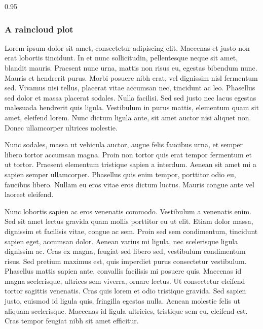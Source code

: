 \documentclass[]{elsarticle} %
\begin{document}
\begin{table}[h]
\begin{centerbox}
\begin{threeparttable}
\begin{tabularx}{0.95\textwidth}
\end{tabularx}
\end{threeparttable}\par\end{centerbox}

\end{table}
 

\newpage

\hypertarget{a-raincloud-plot}{%
\subsubsection{A raincloud plot}\label{a-raincloud-plot}}

Lorem ipsum dolor sit amet, consectetur adipiscing elit. Maecenas et
justo non erat lobortis tincidunt. In et nunc sollicitudin, pellentesque
neque sit amet, blandit mauris. Praesent nunc urna, mattis non risus eu,
egestas bibendum nunc. Mauris et hendrerit purus. Morbi posuere nibh
erat, vel dignissim nisl fermentum sed. Vivamus nisi tellus, placerat
vitae accumsan nec, tincidunt ac leo. Phasellus sed dolor et massa
placerat sodales. Nulla facilisi. Sed sed justo nec lacus egestas
malesuada hendrerit quis ligula. Vestibulum in purus mattis, elementum
quam sit amet, eleifend lorem. Nunc dictum ligula ante, sit amet auctor
nisi aliquet non. Donec ullamcorper ultrices molestie.

Nunc sodales, massa ut vehicula auctor, augue felis faucibus urna, et
semper libero tortor accumsan magna. Proin non tortor quis erat tempor
fermentum et ut tortor. Praesent elementum tristique sapien a interdum.
Aenean sit amet mi a sapien semper ullamcorper. Phasellus quis enim
tempor, porttitor odio eu, faucibus libero. Nullam eu eros vitae eros
dictum luctus. Mauris congue ante vel laoreet eleifend.

Nunc lobortis sapien ac eros venenatis commodo. Vestibulum a venenatis
enim. Sed sit amet lectus gravida quam mollis porttitor eu ut elit.
Etiam dolor massa, dignissim et facilisis vitae, congue ac sem. Proin
sed sem condimentum, tincidunt sapien eget, accumsan dolor. Aenean
varius mi ligula, nec scelerisque ligula dignissim ac. Cras ex magna,
feugiat sed libero sed, vestibulum condimentum risus. Sed pretium
maximus est, quis imperdiet purus consectetur vestibulum. Phasellus
mattis sapien ante, convallis facilisis mi posuere quis. Maecenas id
magna scelerisque, ultrices sem viverra, ornare lectus. Ut consectetur
eleifend tortor sagittis venenatis. Cras quis lorem et odio tristique
gravida. Sed sapien justo, euismod id ligula quis, fringilla egestas
nulla. Aenean molestie felis ut aliquam scelerisque. Maecenas id ligula
ultricies, tristique sem eu, eleifend est. Cras tempor feugiat nibh sit
amet efficitur.
\end{document}
